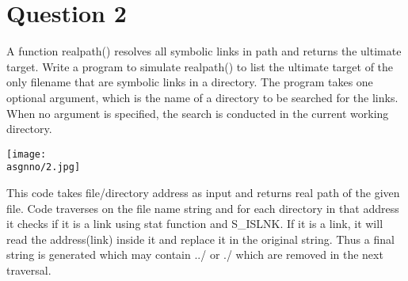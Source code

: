 \documentclass[main.tex]{subfiles}
\begin{document}
\section{Question 2}

A function realpath() resolves all symbolic links in path and returns the
ultimate target. Write a program to simulate realpath() to list the ultimate
target of the only filename that are symbolic links in a directory. The program
takes one optional argument, which is the name of a directory to be searched for
the links. When no argument is specified, the search is conducted in the current
working directory.


\centering\texttt{[image: \\asgnno/2.jpg]}

This code takes file/directory address as input and returns real path of the
given file. Code traverses on the file name string and for each directory in
that address it checks if it is a link using stat function and S\_ISLNK. If it is
a link, it will read the address(link) inside it and replace it in the original
string. Thus a final string is generated which may contain ../ or ./ which
are removed in the next traversal.
\end{document}
